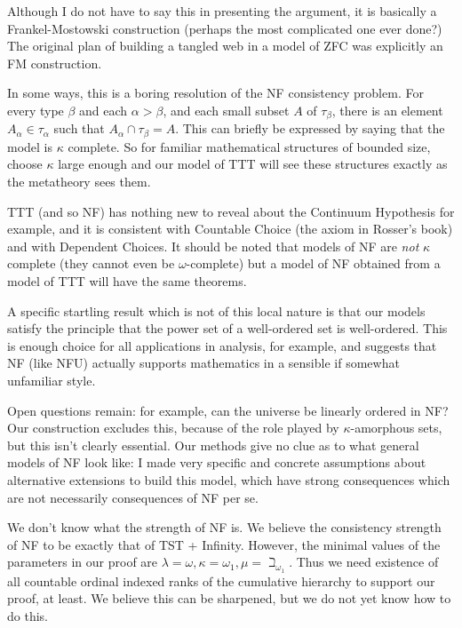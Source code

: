 \documentclass{slides}
\begin{document}
\begin{slide}

Although I do not have to say this in presenting the argument, it is basically a Frankel-Mostowski construction (perhaps the most complicated one ever done?)  The original plan of building a tangled web in a model of ZFC was explicitly an FM construction.

In some ways, this is a boring resolution of the NF consistency problem.  For every type $\beta$ and each $\alpha>\beta$, and each small subset $A$ of $\tau_\beta$, there is an element $A_\alpha \in \tau_\alpha$ such that
$A_\alpha\cap \tau_\beta = A$.  This can briefly be expressed by saying that the model is $\kappa$ complete.  So for familiar mathematical structures of bounded size, choose $\kappa$ large enough and our model of TTT will see these structures exactly as the metatheory sees them.  \end{slide}


\begin{slide} TTT (and so NF) has nothing new to reveal about the Continuum Hypothesis for example, and it is consistent with Countable Choice (the axiom in Rosser's book) and with Dependent Choices.  It should be noted that models of NF are {\em not\/} $\kappa$ complete (they cannot even be $\omega$-complete) but a model of NF obtained from a model of TTT will have the same theorems.

A specific startling result which is not of this local nature is that our models satisfy the principle that the power set of a well-ordered set is well-ordered.  This is enough choice for all applications in analysis, for example, and suggests that NF (like NFU) actually supports mathematics in a sensible if somewhat unfamiliar style.

\end{slide}

\begin{slide}

Open questions remain:  for example, can the universe be linearly ordered in NF?  Our construction excludes this, because of the role played by $\kappa$-amorphous sets, but this isn't clearly essential.  Our methods give no clue as to what general models of NF look like:  I made very specific and concrete assumptions about alternative extensions to build this model, which have strong consequences which are not necessarily consequences of NF per se.

We don't know what the strength of NF is.  We believe the consistency strength of NF to be exactly that of TST + Infinity.  However, the minimal values of the parameters in our proof are $\lambda=\omega, \kappa = \omega_1, \mu= \beth_{\omega_1}$.  Thus we need existence of all countable ordinal indexed ranks of the cumulative hierarchy to support our proof, at least.  We believe this can be sharpened, but we do not yet know how to do this.

\end{slide}
\end{document}
